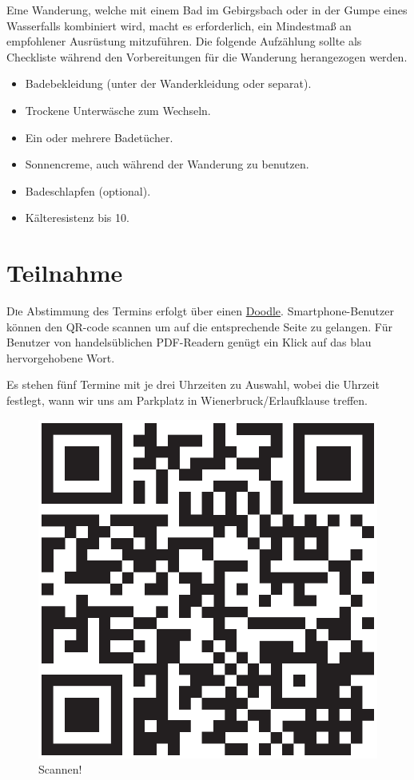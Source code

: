 \documentclass[twoside]{article}
\begin{document}
\begin{multicols}{2}
\lettrine[nindent=0em,lines=3]{E} ine Wanderung, welche mit einem Bad im Gebirgsbach oder in der Gumpe eines Wasserfalls kombiniert wird, macht es erforderlich,
ein Mindestmaß an empfohlener Ausrüstung mitzuführen. Die folgende Aufzählung sollte als Checkliste während den Vorbereitungen für die Wanderung herangezogen
werden.

\begin{itemize}
    \item[\Square] Badebekleidung (unter der Wanderkleidung oder separat).
    \item[\Square] Trockene Unterwäsche zum Wechseln.
    \item[\Square] Ein oder mehrere Badetücher.
    \item[\Square] Sonnencreme, auch während der Wanderung zu benutzen.
    \item[\Square] Badeschlapfen (optional).
    \item[\Square] Kälteresistenz bis 10\celsius.
\end{itemize}


\section{Teilnahme}
\label{sec:teilnahme}

\lettrine[nindent=0em,lines=3]{D} ie Abstimmung des Termins erfolgt über einen \href{http://www.doodle.com/m6ywebgyvg6632ig}{Doodle}. Smartphone-Benutzer
können den QR-code scannen um auf die entsprechende Seite zu gelangen. Für Benutzer von handelsüblichen PDF-Readern genügt ein Klick auf das blau hervorgehobene
Wort.

Es stehen fünf Termine mit je drei Uhrzeiten zu Auswahl, wobei die Uhrzeit festlegt, wann wir uns am Parkplatz in Wienerbruck/Erlaufklause treffen.

\begin{figure}[H]
\begin{center}
  \includegraphics[width=.45\textwidth]{Figures/qr-code.eps}
\end{center}
\caption{Scannen!}
\label{fig:qr-codqr-code}
\end{figure}


\end{multicols}
\end{document}
